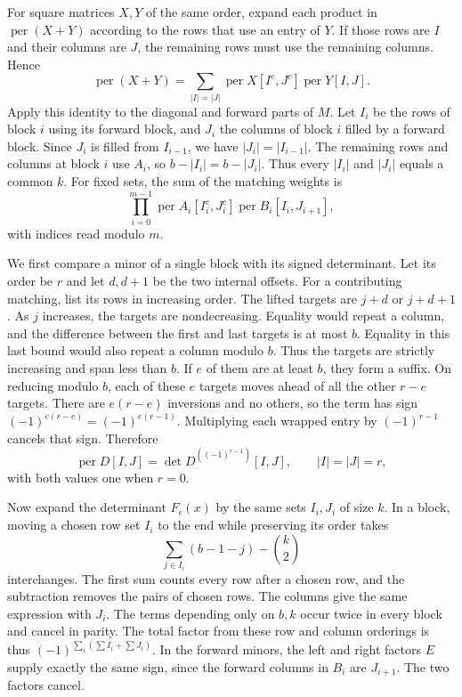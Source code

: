 \documentclass[11pt,reqno]{amsart}
\theoremstyle{remark}
\numberwithin{equation}{section}
\newcommand{\per}{\operatorname{per}}
\begin{document}
For square matrices \(X,Y\) of the same order, expand each product in
\(\per(X+Y)\) according to the rows that use an entry of \(Y\). If those
rows are \(I\) and their columns are \(J\), the remaining rows must use
the remaining columns. Hence
\[
 \per(X+Y)=\sum_{|I|=|J|}
                 \per X[I^c,J^c]\per Y[I,J].
\]
Apply this identity to the diagonal and forward parts of \(M\). Let
\(I_i\) be the rows of block \(i\) using its forward block, and \(J_i\)
the columns of block \(i\) filled by a forward block. Since \(J_i\) is
filled from \(I_{i-1}\), we have \(|J_i|=|I_{i-1}|\). The remaining rows
and columns at block \(i\) use \(A_i\), so \(b-|I_i|=b-|J_i|\). Thus
every \(|I_i|\) and \(|J_i|\) equals a common \(k\). For fixed sets, the
sum of the matching weights is
\begin{equation}\label{eq:block-expansion}
 \prod_{i=0}^{m-1}
       \per A_i[I_i^c,J_i^c]\per B_i[I_i,J_{i+1}],
\end{equation}
with indices read modulo \(m\).

We first compare a minor of a single block with its signed determinant.
Let its order be \(r\) and let \(d,d+1\) be the two internal offsets. For
a contributing matching, list its rows in increasing order. The lifted
targets are \(j+d\) or \(j+d+1\). As \(j\) increases, the targets are
nondecreasing. Equality would repeat a column, and the difference between
the first and last targets is at most \(b\). Equality in this last bound
would also repeat a column modulo \(b\). Thus the targets are strictly
increasing and span less than \(b\). If \(e\) of them are at least \(b\),
they form a suffix. On reducing modulo \(b\), each of these \(e\) targets
moves ahead of all the other \(r-e\) targets. There are \(e(r-e)\)
inversions and no others, so the term has sign
\((-1)^{e(r-e)}=(-1)^{e(r-1)}\). Multiplying each wrapped entry by
\((-1)^{r-1}\) cancels that sign. Therefore
\[
 \per D[I,J]=\det D^{((-1)^{r-1})}[I,J],
 \qquad |I|=|J|=r,
\]
with both values one when \(r=0\).

Now expand the determinant \(F_\epsilon(x)\) by the same sets \(I_i,J_i\)
of size \(k\). In a block, moving a chosen row set \(I_i\) to the end
while preserving its order takes
\[
 \sum_{j\in I_i}(b-1-j)-\binom{k}{2}
\]
interchanges. The first sum counts every row after a chosen row, and the
subtraction removes the pairs of chosen rows. The columns give the same
expression with \(J_i\). The terms depending only on \(b,k\) occur twice
in every block and cancel in parity. The total factor from these row and
column orderings is thus \((-1)^{\sum_i(\sum I_i+\sum J_i)}\). In the
forward minors, the left and right factors \(E\) supply exactly the same
sign, since the forward columns in \(B_i\) are \(J_{i+1}\). The two
factors cancel.
\end{document}
